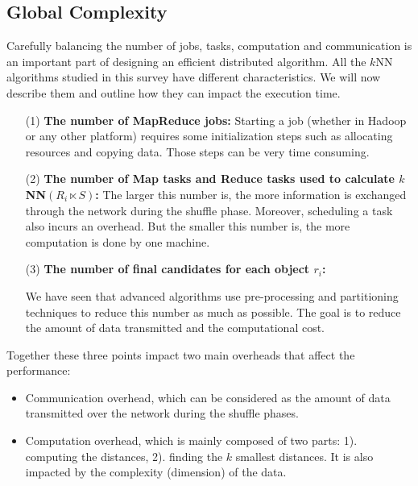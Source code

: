 \subsection{Global Complexity}
\label{section:global_complexity}
Carefully balancing the number of jobs, tasks, computation and communication 
is an important part of designing an efficient distributed algorithm.
All the $k$NN algorithms studied in this survey have different characteristics. We will now describe them 
and outline how they can impact the execution time. 

\begin{itemize}
\item[(1)] \textbf{The number of MapReduce jobs:} Starting a job (whether in 
Hadoop\cite{Jiang:2010:PMI:1920841.1920903} or any other platform) requires some initialization steps 
such as allocating resources and copying data. Those steps can be very time 
consuming.
\item[(2)] \textbf{The number of Map tasks and Reduce tasks used to calculate $k$NN$\left(R_i \ltimes S\right)$:} The 
larger this number is, the more 
information is exchanged through the network during the shuffle phase. 
Moreover, scheduling a task also incurs an overhead. But the smaller this number is, the more computation is done by 
one machine.
\item[(3)] \textbf{The number of final candidates for each object $r_i$:
} %

We have seen that advanced algorithms use pre-processing and partitioning techniques to reduce this number as much as possible. The goal
is to reduce the amount of data transmitted and the computational cost. 
%

\end{itemize} 


Together these three points impact two main overheads that affect the performance:
\begin{itemize}
\item Communication overhead, which can be considered as the amount of data transmitted over the network during the 
shuffle phases. %

\item Computation overhead, which %
is mainly composed of two parts: 1). computing the distances, 2). finding the $k$ smallest distances. It is also 
impacted by the complexity (dimension) of the data.
\end{itemize}

